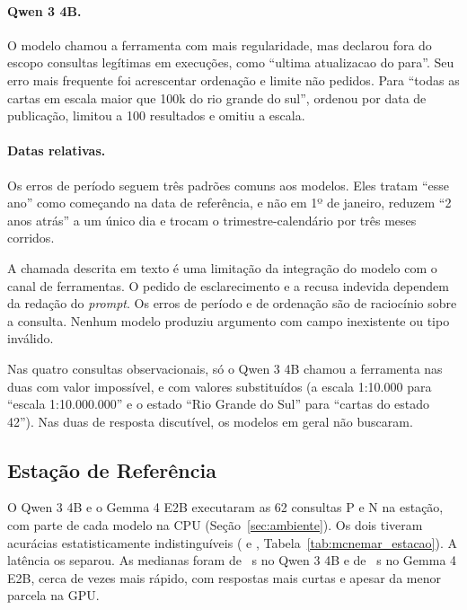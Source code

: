 \paragraph{Qwen 3 4B.} O modelo chamou a ferramenta com mais regularidade, mas declarou fora do escopo consultas legítimas em  execuções, como ``ultima atualizacao do para''. Seu erro mais frequente foi acrescentar ordenação e limite não pedidos. Para ``todas as cartas em escala maior que 100k do rio grande do sul'', ordenou por data de publicação, limitou a 100 resultados e omitiu a escala.

\paragraph{Datas relativas.} Os erros de período seguem três padrões comuns aos modelos. Eles tratam ``esse ano'' como começando na data de referência, e não em 1º de janeiro, reduzem ``2 anos atrás'' a um único dia e trocam o trimestre-calendário por três meses corridos.

A chamada descrita em texto é uma limitação da integração do modelo com o canal de ferramentas. O pedido de esclarecimento e a recusa indevida dependem da redação do \textit{prompt}. Os erros de período e de ordenação são de raciocínio sobre a consulta. Nenhum modelo produziu argumento com campo inexistente ou tipo inválido.

Nas quatro consultas observacionais, só o Qwen 3 4B chamou a ferramenta nas duas com valor impossível, e com valores substituídos (a escala 1:10.000 para ``escala 1:10.000.000'' e o estado ``Rio Grande do Sul'' para ``cartas do estado 42''). Nas duas de resposta discutível, os modelos em geral não buscaram.

\subsection{Estação de Referência}
\label{sec:validacao-local}

O Qwen 3 4B e o Gemma 4 E2B executaram as 62 consultas P e N na estação, com parte de cada modelo na CPU (Seção~\ref{sec:ambiente}). Os dois tiveram acurácias estatisticamente indistinguíveis ( e , Tabela~\ref{tab:mcnemar_estacao}). A latência os separou. As medianas foram de ~s no Qwen 3 4B e de ~s no Gemma 4 E2B, cerca de  vezes mais rápido, com respostas mais curtas e apesar da menor parcela na GPU.


